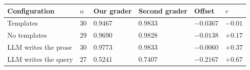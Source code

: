 \begin{tabular}{@{}L{0.26\textwidth}R{0.05\textwidth}R{0.14\textwidth}R{0.15\textwidth}R{0.11\textwidth}R{0.08\textwidth}@{}}
\toprule
Configuration & $n$ & Our grader & Second grader & Offset & $r$ \\
\midrule
Templates & 30 & 0.9467 & 0.9833 & $-0.0367$ & $-0.01$ \\
No templates & 29 & 0.9690 & 0.9828 & $-0.0138$ & $+0.17$ \\
LLM writes the prose & 30 & 0.9773 & 0.9833 & $-0.0060$ & $+0.37$ \\
LLM writes the query & 27 & 0.5241 & 0.7407 & $-0.2167$ & $+0.67$ \\
\bottomrule
\end{tabular}
